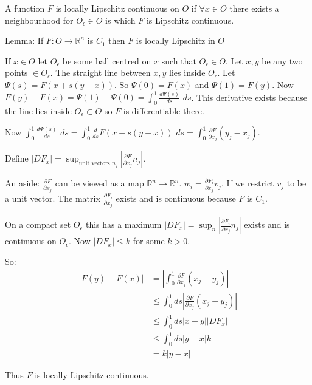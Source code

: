 A function $F$ is locally Lipschitz continuous on $O$ if $\forall x \in O$ there exists a neighbourhood for $O_{\epsilon} \in O$ is which $F$ is Lipschitz continuous.

Lemma: If $F:O\rightarrow \mathbb{R}^n$ is $C_1$ then $F$ is locally Lipschitz in $O$

If $x \in O$ let $O_{\epsilon}$ be some ball centred on $x$ such that $O_{\epsilon} \in O$. Let $x,y$ be any two points $\in O_{\epsilon}$. The straight line between $x,y$ lies inside $O_{\epsilon}$. Let $\Psi(s) = F(x+s(y-x))$. So $\Psi(0) = F(x)$ and $\Psi(1) = F(y)$. Now $F(y) - F(x) = \Psi(1) - \Psi(0) = \int_0^1 \frac{d\Psi(s)}{ds} \, \, ds$. This derivative exists because the line lies inside $O_{\epsilon} \subset O$ so $F$ is differentiable there.

Now $\int_0^1 \frac{d\Psi(s)}{ds} \, \, ds = \int_0^1 \frac{d}{ds} F(x + s(y-x)) \, \, ds = \int_0^1 \frac{\partial F}{\partial x_j} (y_j - x_j)$.

Define $|DF_x| = \sup_{\text{unit vectors $n_j$}} |\frac{\partial F}{\partial x_j} n_j|$.

An aside: $\frac{\partial F}{\partial x_j}$ can be viewed as a map $\mathbb{R}^n \rightarrow \mathbb{R}^n$. $w_i = \frac{\partial F_i}{\partial x_j} v_j$. If we restrict $v_j$ to be a unit vector. The matrix $\frac{\partial F_i}{\partial x_j}$ exists and is continuous because $F$ is $C_1$.

On a compact set $O_{\epsilon}$ this has a maximum $|DF_x| = \sup_{n} |\frac{\partial F_i}{\partial x_j} n_j|$ exists and is continuous on $O_{\epsilon}$. Now $|DF_x| \leq k$ for some $k>0$. 

So: 
\begin{align*}
|F(y) - F(x)| &= | \int_0^1 \frac{\partial F}{\partial x_j} (x_j - y_j)| \\
&\leq \int_0^1 ds | \frac{\partial F}{\partial x_j} (x_j - y_j)| \\
&\leq \int_0^1 ds |x-y| |DF_x| \\
&\leq \int_0^1 ds |y-x| k \\
&= k |y-x|
\end{align*}

Thus $F$ is locally Lipschitz continuous.